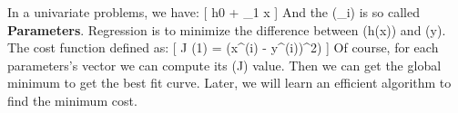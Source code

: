 In a univariate problems, we have:\markdownRendererInterblockSeparator
{}[ h0 + \theta_1 x ]\markdownRendererInterblockSeparator
{}And the (\theta_i) is so called \textbf{Parameters}.\markdownRendererInterblockSeparator
{}Regression is to minimize the difference between (h(x)) and (y). The cost function defined as:\markdownRendererInterblockSeparator
{}[ J (\theta{}1) =  \sum{}\theta(x^{(i)} - y^{(i)})^2\right) ]\markdownRendererInterblockSeparator
{}Of course, for each parameters's vector we can compute its (J) value. Then we can get the global minimum to get the best fit curve. Later, we will learn an efficient algorithm to find the minimum cost.\markdownRendererInterblockSeparator
{}\markdownRendererInterblockSeparator
{}\relax